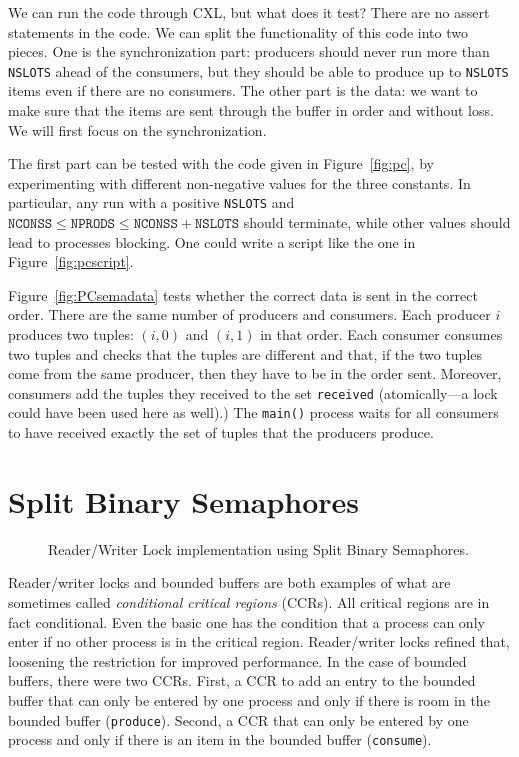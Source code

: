 \documentclass{report}
\newenvironment{code}{
\tcolorbox
}{
\endtcolorbox
}
\begin{document}
We can run the code through CXL, but what does it test?  There are no
assert statements in the code.
We can split the functionality of this code into two pieces.  One is
the synchronization part: producers should never run more than \texttt{NSLOTS}
ahead of the consumers, but they should be able to produce up to \texttt{NSLOTS}
items even if there are no consumers.  The other part is the data: we want
to make sure that the items are sent through the buffer in order and without
loss.  We will first focus on the synchronization.

The first part can be tested with the code given in Figure~\ref{fig:pc}, by
experimenting with different non-negative values for the three constants.
In particular, any run with a positive \texttt{NSLOTS} and
$\mathtt{NCONSS} \le \mathtt{NPRODS} \le \mathtt{NCONSS} + \mathtt{NSLOTS}$
should terminate, while other values should lead to processes blocking.
One could write a script like the one in Figure~\ref{fig:pcscript}.

Figure~\ref{fig:PCsemadata} tests whether the correct data is sent in
the correct order.  There are the same number of producers and consumers.
Each producer $i$ produces two tuples: $(i, 0)$ and $(i, 1)$ in that order.
Each consumer consumes two tuples and checks that the tuples are different
and that, if the two tuples come from the same producer, then they have to
be in the order sent.
Moreover, consumers add the tuples they received to the set
\texttt{received} (atomically---a lock could have been used here as well).)
The \texttt{main()} process waits for all consumers to have received
exactly the set of tuples that the producers produce.

\chapter{Split Binary Semaphores}

\begin{figure}
\begin{code}
\end{code}
\caption{Reader/Writer Lock implementation using Split Binary Semaphores.}
\label{fig:RWsplitsema}
\end{figure}

Reader/writer locks and bounded buffers are both examples of what are
sometimes called \emph{conditional critical regions} (CCRs).
All critical regions are in fact conditional.  Even the basic one
has the condition that a process can only enter if no other process
is in the critical region.  Reader/writer locks refined that, loosening
the restriction for improved performance.  In the case of bounded buffers,
there were two CCRs.  First, a CCR
to add an entry to the bounded buffer that can only be entered by one
process and only if there is room in the bounded buffer (\texttt{produce}).
Second, a CCR that can only be entered by one process and
only if there is an item in the bounded buffer (\texttt{consume}).
\end{document}

